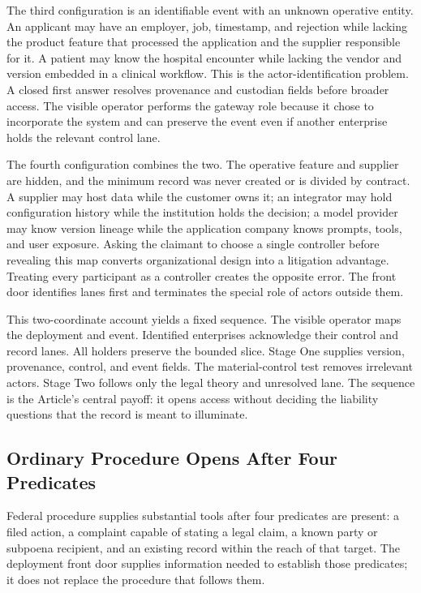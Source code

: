 The third configuration is an identifiable event with an unknown operative entity. An applicant may have an employer, job, timestamp, and rejection while lacking the product feature that processed the application and the supplier responsible for it. A patient may know the hospital encounter while lacking the vendor and version embedded in a clinical workflow. This is the actor-identification problem. A closed first answer resolves provenance and custodian fields before broader access. The visible operator performs the gateway role because it chose to incorporate the system and can preserve the event even if another enterprise holds the relevant control lane.

The fourth configuration combines the two. The operative feature and supplier are hidden, and the minimum record was never created or is divided by contract. A supplier may host data while the customer owns it; an integrator may hold configuration history while the institution holds the decision; a model provider may know version lineage while the application company knows prompts, tools, and user exposure. Asking the claimant to choose a single controller before revealing this map converts organizational design into a litigation advantage. Treating every participant as a controller creates the opposite error. The front door identifies lanes first and terminates the special role of actors outside them.

This two-coordinate account yields a fixed sequence. The visible operator maps the deployment and event. Identified enterprises acknowledge their control and record lanes. All holders preserve the bounded slice. Stage One supplies version, provenance, control, and event fields. The material-control test removes irrelevant actors. Stage Two follows only the legal theory and unresolved lane. The sequence is the Article's central payoff: it opens access without deciding the liability questions that the record is meant to illuminate.

\subsection{Ordinary Procedure Opens After Four Predicates}
\label{sec:ordinary-procedure}

Federal procedure supplies substantial tools after four predicates are present: a filed action, a complaint capable of stating a legal claim, a known party or subpoena recipient, and an existing record within the reach of that target. The deployment front door supplies information needed to establish those predicates; it does not replace the procedure that follows them.

